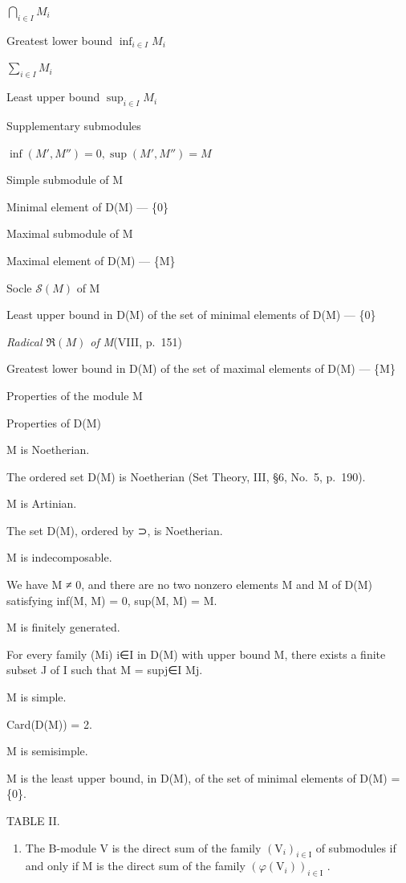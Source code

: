 \(\bigcap_{i\in I} M_i\)

Greatest lower bound \(\inf_{i\in I} M_i\)

\(\sum_{i\in I} M_i\)

Least upper bound \(\sup_{i\in I} M_i\)

Supplementary submodules

\(\inf(M', M'') = 0, \sup(M', M'') = M\)

Simple submodule of M

Minimal element of D(M) --- \{0\}

Maximal submodule of M

Maximal element of D(M) --- \{M\}

Socle \(\mathscr{S}(M)\) of M

Least upper bound in D(M) of the set of minimal elements of D(M) --- \{0\}

\emph{Radical \(\Re(M)\) of M}(VIII, p.~151)

Greatest lower bound in D(M) of the set of maximal elements of D(M) --- \{M\}

Properties of the module M

Properties of D(M)

M is Noetherian.

The ordered set D(M) is Noetherian (Set Theory, III, §6, No.~5, p.~190).

M is Artinian.

The set D(M), ordered by ⊃, is Noetherian.

M is indecomposable.

We have M ≠ 0, and there are no two nonzero elements M\textquotesingle{} and M\textquotesingle\textquotesingle{} of D(M) satisfying inf(M\textquotesingle, M\textquotesingle\textquotesingle) = 0, sup(M\textquotesingle, M\textquotesingle\textquotesingle) = M.

M is finitely generated.

For every family (Mi) i∈I in D(M) with upper bound M, there exists a finite subset J of I such that M = supj∈I Mj.

M is simple.

Card(D(M)) = 2.

M is semisimple.

M is the least upper bound, in D(M), of the set of minimal elements of D(M) = \{0\}.

TABLE II.

\begin{enumerate}
\def\labelenumi{\alph{enumi})}
\setcounter{enumi}{2}
\tightlist
\item
  The B-module V is the direct sum of the family \((\mathrm{V}_{i})_{i\in\mathrm{I}}\) of submodules if and only if M is the direct sum of the family \((\varphi(\mathrm{V}_{i}))_{i\in\mathrm{I}}\) .
\end{enumerate}

